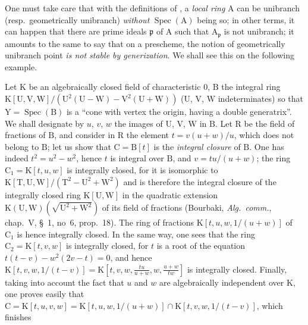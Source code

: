 \begin{env}[6.15.2]
\label{IV.6.15.2}
One must take care that with the definitions of , a \emph{local
ring} $\mathrm{A}$ can be unibranch (resp.\ geometrically unibranch) \emph{without} $\operatorname{Spec}(\mathrm{A})$
being so; in other terms, it can happen that there are prime ideals $\mathfrak{p}$ of $\mathrm{A}$ such
that $\mathrm{A}_\mathfrak{p}$ is not unibranch; it amounts to the same to say that on a prescheme,
the notion of geometrically unibranch point \emph{is not stable by generization}. We
shall see this on the following example.
\end{env}


Let $\mathrm{K}$ be an algebraically closed field of characteristic $0$, $\mathrm{B}$ the integral ring
$\mathrm{K}[\mathrm{U},\mathrm{V},\mathrm{W}]/(\mathrm{U}^2(\mathrm{U}-\mathrm{W})-\mathrm{V}^2(\mathrm{U}+\mathrm{W}))$ ($\mathrm{U}$, $\mathrm{V}$, $\mathrm{W}$ indeterminates) so that
$\mathrm{Y}=\operatorname{Spec}(\mathrm{B})$ is a ``cone with vertex the origin, having a double generatrix''.
We shall designate by $u$, $v$, $w$ the images of $\mathrm{U}$, $\mathrm{V}$, $\mathrm{W}$ in $\mathrm{B}$. Let $\mathrm{R}$ be the field of
fractions of $\mathrm{B}$, and consider in $\mathrm{R}$ the element $t=v(u+w)/u$, which does not belong
to $\mathrm{B}$; let us show that $\mathrm{C}=\mathrm{B}[t]$ is the \emph{integral closure} of $\mathrm{B}$. One has indeed $t^2=u^2-w^2$,
hence $t$ is integral over $\mathrm{B}$, and $v=tu/(u+w)$; the ring $\mathrm{C}_1=\mathrm{K}[t,u,w]$ is integrally
closed, for it is isomorphic to $\mathrm{K}[\mathrm{T},\mathrm{U},\mathrm{W}]/(\mathrm{T}^2-\mathrm{U}^2+\mathrm{W}^2)$ and is therefore the integral
closure of the integrally closed ring $\mathrm{K}[\mathrm{U},\mathrm{W}]$ in the quadratic extension
$\mathrm{K}(\mathrm{U},\mathrm{W})(\sqrt{\mathrm{U}^2+\mathrm{W}^2})$ of its field of fractions (Bourbaki, \emph{Alg.~comm.}, chap.~V, \S~1,
no~6, prop.~18). The ring of fractions $\mathrm{K}[t,u,w,1/(u+w)]$ of $\mathrm{C}_1$ is hence
integrally closed. In the same way, one sees that the ring $\mathrm{C}_2=\mathrm{K}[t,v,w]$ is
integrally closed, for $t$ is a root of the equation $t(t-v)-w^2(2v-t)=0$, and hence
$\mathrm{K}[t,v,w,1/(t-v)]=\mathrm{K}[t,v,w,\frac{tu}{u+w},w,\frac{u+w}{tw}]$ is integrally closed. Finally, taking into
account the fact that $u$ and $w$ are algebraically independent over $\mathrm{K}$, one proves easily
that $\mathrm{C}=\mathrm{K}[t,u,v,w]=\mathrm{K}[t,u,w,1/(u+w)]\cap\mathrm{K}[t,v,w,1/(t-v)]$, which finishes
